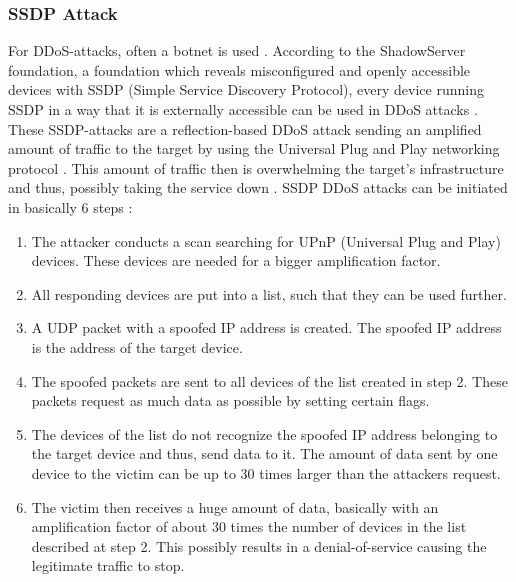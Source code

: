 \subsubsection*{SSDP Attack}
For DDoS-attacks, often a botnet is used \cite{nazario2008ddos, DDoS-MELANI}. According to the ShadowServer foundation, a foundation which reveals misconfigured and openly accessible devices with SSDP (Simple Service Discovery Protocol), every device running SSDP in a way that it is externally accessible can be used in DDoS attacks \cite{Shadowserver}. These SSDP-attacks are a reflection-based DDoS attack sending an amplified amount of traffic to the target by using the Universal Plug and Play networking protocol \cite{Cloudflare-SSDP}. This amount of traffic then is overwhelming the target's infrastructure and thus, possibly taking the service down \cite{Cloudflare-SSDP}. SSDP DDoS attacks can be initiated in basically 6 steps \cite{Cloudflare-SSDP}:
\begin{enumerate}
    \item The attacker conducts a scan searching for UPnP (Universal Plug and Play) devices. These devices are needed for a bigger amplification factor. 
    \item All responding devices are put into a list, such that they can be used further. 
    \item A UDP packet with a spoofed IP address is created. The spoofed IP address is the address of the target device.
    \item The spoofed packets are sent to all devices of the list created in step 2. These packets request as much data as possible by setting certain flags.
    \item The devices of the list do not recognize the spoofed IP address belonging to the target device and thus, send data to it. The amount of data sent by one device to the victim can be up to 30 times larger than the attackers request. 
    \item The victim then receives a huge amount of data, basically with an amplification factor of about 30 times the number of devices in the list described at step 2. This possibly results in a denial-of-service causing the legitimate traffic to stop. 
\end{enumerate}

